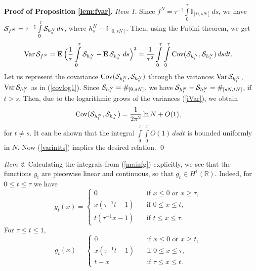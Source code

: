 \documentclass{article}
\numberwithin{equation}{section}
\newcommand{\mR}{\mathbb{R}}
\newcommand{\mI}{\mathbb{I}}
\newcommand{\SSS}{{\cal S}}
\newcommand{\Cov}{\operatorname{Cov}}
\newcommand{\Var}{\operatorname{Var}}
\newcommand{\ssk}{\smallskip}
\newcommand{\MO}{\mbox{\bf E}\,}
\newcommand{\fr}{\frac}
\newcommand{\qmb}{\quad\mbox}
\newcommand{\ili}{\int\limits}
\newcommand{\lbl}{\label}
\newcommand{\rprop}{Proposition \nolinebreak}
\newcommand{\bee}{\begin{equation}}
\newcommand{\eee}{\end{equation}}
\begin{document}
{\bf Proof of \rprop \ref{lem:fvar}.}
{\it Item 1.} Since $f^N=\tau^{-1}\ili_0^{\tau} \mI_{[0,sN]} \,ds$, we have
$\SSS_{f^N}=\tau^{-1}\ili_0^{\tau} \SSS_{h^N_s}  \, ds$,
where $h^N_s=\mI_{[0,sN]}$.
Then, using the Fubini theorem, we get
\bee\lbl{varintts}
\Var\SSS_{f^N}
=\MO\Big(\fr{1}{\tau}\ili_0^{\tau} \SSS_{h^N_s} - \MO \SSS_{h^N_s} \, ds\Big)^2
=\fr{1}{\tau^2}\ili_0^{\tau}\ili_0^{\tau}\Cov(\SSS_{h^N_t},\SSS_{h^N_s})\, dsdt.
\eee
Let us represent the covariance
$\Cov(\SSS_{h^N_t},\SSS_{h^N_s})$
through the variances
$\Var\SSS_{h^N_t}$, $\Var\SSS_{h^N_s}$
as in (\ref{covlog1}).
Since
$\SSS_{h_s^N}=\#_{[0,sN]}$,
we have
$\SSS_{h_t^N}-\SSS_{h_s^N}=\#_{[sN,tN]}$,
if $t>s$.
Then, due to the logarithmic grows
of the variances (\ref{iVar}), we obtain
$$
\Cov(\SSS_{h^N_t},\SSS_{h^N_s})=\fr{1}{2\pi^2} \ln N + O(1),
$$
for $t\neq s$. It can be shown that the integral  $\ili_0^{\tau}\ili_0^{\tau} O(1) \, dsdt$ is
bounded uniformly in $N$.
Now (\ref{varintts}) implies the desired relation.
\qed

\ssk
{\it Item 2.}
Calculating the integrals from (\ref{mainfg}) explicitly, we see that
the functions $g_t$ are piecewise linear and continuous, so that
$g_t\in H^1(\mR)$.
Indeed,
for $0\leq t\leq \tau $ we have
\bee\lbl{gtx}
g_t(x)=
\left\{
\begin{array}{cl}
0 &\qmb{if } x \leq 0 \mbox{ or } x\geq \tau, \\
x(\tau^{-1}t-1) &\qmb{if } 0\leq x\leq t, \\
t(\tau^{-1}x-1) &\qmb{if } t \leq x\leq \tau.
\end{array}
\right.
\eee
For $\tau \leq t\leq 1$,
\bee\lbl{gtx1}
g_t(x)=
\left\{
\begin{array}{cl}
0 &\qmb{if } x \leq 0 \mbox{ or } x\geq t, \\
x(\tau^{-1}t-1) &\qmb{if } 0\leq x\leq \tau, \\
t-x &\qmb{if } \tau \leq x\leq t.
\end{array}
\right.
\eee
\end{document}
